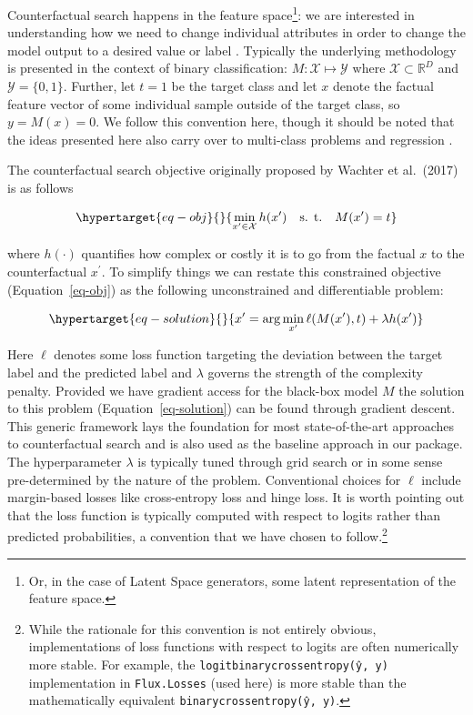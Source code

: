 \documentclass[
  letterpaper,
  DIV=11,
  numbers=noendperiod]{scrartcl}
\begin{document}
Counterfactual search happens in the feature space\footnote{Or, in the
  case of Latent Space generators, some latent representation of the
  feature space.}: we are interested in understanding how we need to
change individual attributes in order to change the model output to a
desired value or label \cite{molnar2020interpretable}. Typically the
underlying methodology is presented in the context of binary
classification: \(M: \mathcal{X} \mapsto \mathcal{Y}\) where
\(\mathcal{X}\subset\mathbb{R}^D\) and \(\mathcal{Y}=\{0,1\}\). Further,
let \(t=1\) be the target class and let \(x\) denote the factual feature
vector of some individual sample outside of the target class, so
\(y=M(x)=0\). We follow this convention here, though it should be noted
that the ideas presented here also carry over to multi-class problems
and regression \cite{molnar2020interpretable}.

The counterfactual search objective originally proposed by Wachter et
al.~(2017) \cite{wachter2017counterfactual} is as follows

\begin{equation}\protect\hypertarget{eq-obj}{}{
\min_{x^\prime \in \mathcal{X}} h(x^\prime) \ \ \ \mbox{s. t.} \ \ \ M(x^\prime) = t
}\label{eq-obj}\end{equation}

where \(h(\cdot)\) quantifies how complex or costly it is to go from the
factual \(x\) to the counterfactual \(x^\prime\). To simplify things we
can restate this constrained objective (Equation~\ref{eq-obj}) as the
following unconstrained and differentiable problem:

\begin{equation}\protect\hypertarget{eq-solution}{}{
x^\prime = \arg \min_{x^\prime}  \ell(M(x^\prime),t) + \lambda h(x^\prime)
}\label{eq-solution}\end{equation}

Here \(\ell\) denotes some loss function targeting the deviation between
the target label and the predicted label and \(\lambda\) governs the
strength of the complexity penalty. Provided we have gradient access for
the black-box model \(M\) the solution to this problem
(Equation~\ref{eq-solution}) can be found through gradient descent. This
generic framework lays the foundation for most state-of-the-art
approaches to counterfactual search and is also used as the baseline
approach in our package. The hyperparameter \(\lambda\) is typically
tuned through grid search or in some sense pre-determined by the nature
of the problem. Conventional choices for \(\ell\) include margin-based
losses like cross-entropy loss and hinge loss. It is worth pointing out
that the loss function is typically computed with respect to logits
rather than predicted probabilities, a convention that we have chosen to
follow.\footnote{While the rationale for this convention is not entirely
  obvious, implementations of loss functions with respect to logits are
  often numerically more stable. For example, the
  \texttt{logitbinarycrossentropy(ŷ,\ y)} implementation in
  \texttt{Flux.Losses} (used here) is more stable than the
  mathematically equivalent \texttt{binarycrossentropy(ŷ,\ y)}.}
\end{document}
